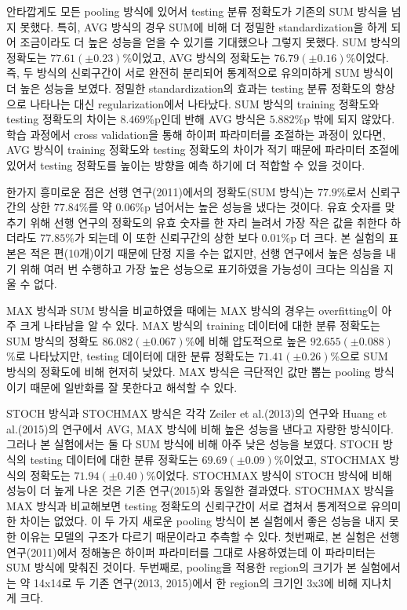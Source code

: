 \documentclass[a4paper,9pt]{article}
\begin{document}
\begin{multicols*}{2}
안타깝게도 모든 pooling 방식에 있어서 testing 분류 정확도가 기존의 SUM 방식을 넘지 못했다.
특히, AVG 방식의 경우 SUM에 비해 더 정밀한 standardization을 하게 되어 조금이라도 더 높은 성능을 얻을 수 있기를 기대했으나 그렇지 못했다.
SUM 방식의 정확도는 $77.61(\pm 0.23)$\%이었고, AVG 방식의 정확도는 $76.79(\pm 0.16)$\%이었다.
즉, 두 방식의 신뢰구간이 서로 완전히 분리되어 통계적으로 유의미하게 SUM 방식이 더 높은 성능을 보였다.
정밀한 standardization의 효과는 testing 분류 정확도의 향상으로 나타나는 대신 regularization에서 나타났다.
SUM 방식의 training 정확도와 testing 정확도의 차이는 $8.469$\%p인데 반해 AVG 방식은 $5.882$\%p 밖에 되지 않았다.
학습 과정에서 cross validation을 통해 하이퍼 파라미터를 조절하는 과정이 있다면, AVG 방식이 training 정확도와 testing 정확도의 차이가 적기 때문에 파라미터 조절에 있어서 testing 정확도를 높이는 방향을 예측 하기에 더 적합할 수 있을 것이다.

한가지 흥미로운 점은 선행 연구(2011)에서의 정확도(SUM 방식)는 $77.9$\%로서 신뢰구간의 상한 $77.84$\%를 약 $0.06$\%p 넘어서는 높은 성능을 냈다는 것이다.
유효 숫자를 맞추기 위해 선행 연구의 정확도의 유효 숫자를 한 자리 늘려서 가장 작은 값을 취한다 하더라도 $77.85$\%가 되는데 이 또한 신뢰구간의 상한 보다 $0.01$\%p 더 크다.
본 실험의 표본은 적은 편(10개)이기 때문에 단정 지을 수는 없지만, 선행 연구에서 높은 성능을 내기 위해 여러 번 수행하고 가장 높은 성능으로 표기하였을 가능성이 크다는 의심을 지울 수 없다.

MAX 방식과 SUM 방식을 비교하였을 때에는 MAX 방식의 경우는 overfitting이 아주 크게 나타남을 알 수 있다.
MAX 방식의 training 데이터에 대한 분류 정확도는 SUM 방식의 정확도 $86.082(\pm 0.067)$\%에 비해 압도적으로 높은 $92.655(\pm 0.088)$\%로 나타났지만, testing 데이터에 대한 분류 정확도는 $71.41(\pm 0.26)$\%으로 SUM 방식의 정확도에 비해 현저히 낮았다.
MAX 방식은 극단적인 값만 뽑는 pooling 방식이기 때문에 일반화를 잘 못한다고 해석할 수 있다.

STOCH 방식과 STOCHMAX 방식은 각각 Zeiler et al.(2013)의 연구와 Huang et al.(2015)의 연구에서 AVG, MAX 방식에 비해 높은 성능을 낸다고 자랑한 방식이다.
그러나 본 실험에서는 둘 다 SUM 방식에 비해 아주 낮은 성능을 보였다.
STOCH 방식의 testing 데이터에 대한 분류 정확도는 $69.69(\pm 0.09)$\%이었고, STOCHMAX 방식의 정확도는 $71.94(\pm 0.40)$\%이었다.
STOCHMAX 방식이 STOCH 방식에 비해 성능이 더 높게 나온 것은 기존 연구(2015)와 동일한 결과였다.
STOCHMAX 방식을 MAX 방식과 비교해보면 testing 정확도의 신뢰구간이 서로 겹쳐서 통계적으로 유의미한 차이는 없었다.
이 두 가지 새로운 pooling 방식이 본 실험에서 좋은 성능을 내지 못한 이유는 모델의 구조가 다르기 때문이라고 추측할 수 있다.
첫번째로, 본 실험은 선행 연구(2011)에서 정해놓은 하이퍼 파라미터를 그대로 사용하였는데 이 파라미터는 SUM 방식에 맞춰진 것이다.
두번째로, pooling을 적용한 region의 크기가 본 실험에서는 약 14x14로 두 기존 연구(2013, 2015)에서 한 region의 크기인 3x3에 비해 지나치게 크다.


\end{multicols*}
\end{document}
